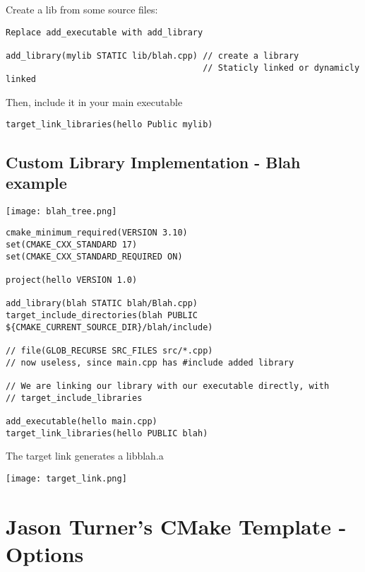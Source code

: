 \documentclass[openany]{report}
\begin{document}
Create a lib from some source files:

\begin{verbatim}
Replace add_executable with add_library

add_library(mylib STATIC lib/blah.cpp) // create a library
                                       // Staticly linked or dynamicly linked
\end{verbatim}

Then, include it in your main executable
\begin{verbatim}
target_link_libraries(hello Public mylib)
\end{verbatim}

\subsection{Custom Library Implementation - Blah example}

\begin{center}
    \texttt{[image: blah\_tree.png]}
\end{center}

\begin{verbatim}
cmake_minimum_required(VERSION 3.10)
set(CMAKE_CXX_STANDARD 17)
set(CMAKE_CXX_STANDARD_REQUIRED ON)

project(hello VERSION 1.0)

add_library(blah STATIC blah/Blah.cpp)
target_include_directories(blah PUBLIC ${CMAKE_CURRENT_SOURCE_DIR}/blah/include)

// file(GLOB_RECURSE SRC_FILES src/*.cpp)
// now useless, since main.cpp has #include added library

// We are linking our library with our executable directly, with
// target_include_libraries

add_executable(hello main.cpp)
target_link_libraries(hello PUBLIC blah)
\end{verbatim}

The target link generates a libblah.a

\begin{center}
    \texttt{[image: target\_link.png]}
\end{center}

\section{Jason Turner's CMake Template - Options}
\end{document}
